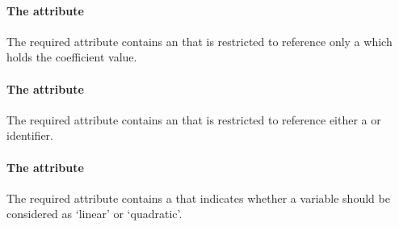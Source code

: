 \paragraph{The  attribute}
The required  attribute contains an  that is restricted to reference only a \Parameter which holds the coefficient value.

\paragraph{The  attribute}
The required  attribute contains an  that is restricted to reference either a \Reaction or \Parameter identifier.

\paragraph{The  attribute}
The required  attribute contains a  that indicates whether a variable should be considered as `linear' or `quadratic'.

